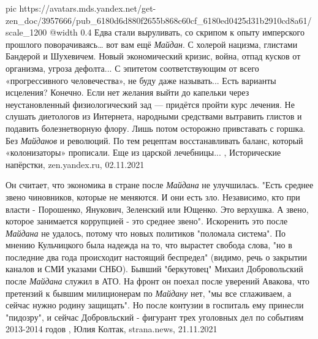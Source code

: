 \ifcmt
  pic https://avatars.mds.yandex.net/get-zen_doc/3957666/pub_6180d6d880f2655b868c60cf_6180ed0425d31b2910cd8a61/scale_1200
  @width 0.4
\fi
Едва стали выруливать, со скрипом к опыту имперского прошлого поворачиваясь…
вот вам ещё \emph{Майдан}. С холерой нацизма, глистами Бандерой и Шухевичем.
Новый экономический кризис, война, отпад кусков от организма, угроза дефолта...
С эпитетом соответствующим от всего «прогрессивного человечества», не буду даже
называть...  Есть варианты исцеления? Конечно. Если нет желания выйти до
капельки через неустановленный физиологический зад — придётся пройти курс
лечения. Не слушать диетологов из Интернета, народными средствами вытравить
глистов и подавить болезнетворную флору. Лишь потом осторожно привставать с
горшка. Без \emph{Майданов} и революций. По тем рецептам восстанавливать
баланс, который «колонизаторы» прописали. Еще из царской лечебницы...
, 
Исторические напёрстки, zen.yandex.ru, 02.11.2021

Он считает, что экономика в стране после \emph{Майдана} не улучшилась. "Есть среднее
звено чиновников, которые не меняются. И они есть зло. Независимо, кто при
власти - Порошенко, Янукович, Зеленский или Ющенко. Это верхушка. А звено,
которое занимается коррупцией - это среднее звено".  Искоренить это после
\emph{Майдана} не удалось, потому что новых политиков "поломала система". По
мнению Кульчицкого была надежда на то, что вырастет свобода слова, "но в
последние два года происходит настоящий беспредел" (видимо, речь о закрытии
каналов и СМИ указами СНБО).  Бывший "беркутовец" Михаил Добровольский после
\emph{Майдана} служил в АТО. На фронт он поехал после уверений Авакова, что
претензий к бывшим милиционерам по \emph{Майдану} нет, "мы все сглаживаем, а
сейчас нужно родину защищать".  Но после контузии в госпиталь ему принесли
"пидозру", и сейчас Добровльский - фигурант трех уголовных дел по событиям
2013-2014 годов
, 
Юлия Колтак, strana.news, 21.11.2021

